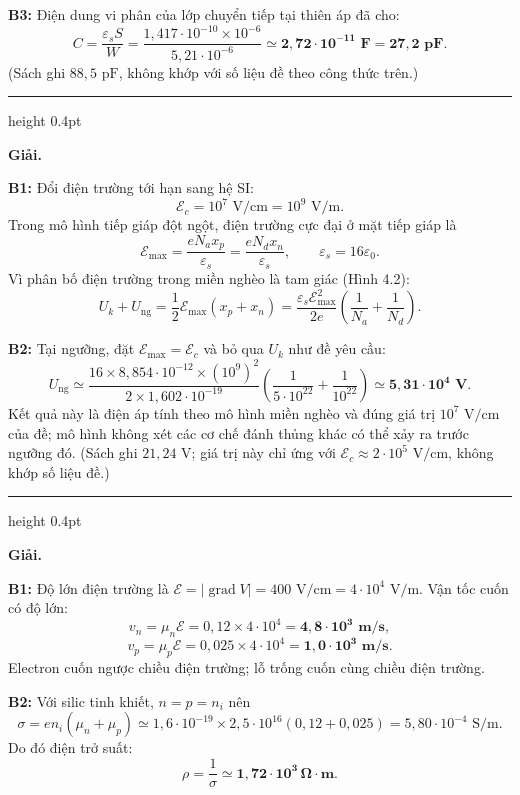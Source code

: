 \documentclass[11pt,a4paper]{article}
\renewcommand{\boldsymbol}[1]{\symbf{#1}}
\let\DeBaiOriginal\DeBai
\renewcommand{\DeBai}[1]{\par\Needspace{5\baselineskip}\DeBaiOriginal{#1}}
\newcommand{\PhanCachBai}{%
  \par\Needspace{7\baselineskip}%
  \addvspace{6pt}%
  {\color{black!40}\hrule height 0.4pt}%
  \nobreak\vspace{7pt}\nobreak
}
\begin{document}
\textbf{B3:} Điện dung vi phân của lớp chuyển tiếp tại thiên áp đã cho:
\[
C=\frac{\varepsilon_s S}{W}
=\frac{1{,}417\cdot10^{-10}\times10^{-6}}{5{,}21\cdot10^{-6}}
\simeq\boldsymbol{2{,}72\cdot10^{-11}\text{ F}=27{,}2\text{ pF}}.
\]
(Sách ghi $88{,}5\text{ pF}$, không khớp với số liệu đề theo công thức trên.)

\PhanCachBai


\textbf{Giải.}

\textbf{B1:} Đổi điện trường tới hạn sang hệ SI:
\[
\mathcal E_c=10^7\text{ V/cm}=10^9\text{ V/m}.
\]
Trong mô hình tiếp giáp đột ngột, điện trường cực đại ở mặt tiếp giáp là
\[
\mathcal E_{\max}=\frac{eN_a x_p}{\varepsilon_s}
=\frac{eN_d x_n}{\varepsilon_s},\qquad
\varepsilon_s=16\varepsilon_0.
\]
Vì phân bố điện trường trong miền nghèo là tam giác (Hình 4.2):
\[
U_k+U_{\mathrm{ng}}=\frac12\mathcal E_{\max}(x_p+x_n)
=\frac{\varepsilon_s\mathcal E_{\max}^2}{2e}
\left(\frac1{N_a}+\frac1{N_d}\right).
\]

\textbf{B2:} Tại ngưỡng, đặt $\mathcal E_{\max}=\mathcal E_c$ và bỏ qua $U_k$ như đề yêu cầu:
\[
U_{\mathrm{ng}}\simeq
\frac{16\times8{,}854\cdot10^{-12}\times(10^9)^2}{2\times1{,}602\cdot10^{-19}}
\left(\frac1{5\cdot10^{22}}+\frac1{10^{22}}\right)
\simeq\boldsymbol{5{,}31\cdot10^4\text{ V}}.
\]
Kết quả này là điện áp tính theo mô hình miền nghèo và đúng giá trị
$10^7\text{ V/cm}$ của đề; mô hình không xét các cơ chế đánh thủng khác có thể xảy ra trước ngưỡng đó.
(Sách ghi $21{,}24\text{ V}$; giá trị này chỉ ứng với $\mathcal E_c\approx2\cdot10^5\text{ V/cm}$, không khớp số liệu đề.)

\PhanCachBai


\textbf{Giải.}

\textbf{B1:} Độ lớn điện trường là
$\mathcal E=|\operatorname{grad}V|=400\text{ V/cm}=4\cdot10^4\text{ V/m}$.
Vận tốc cuốn có độ lớn:
\[
v_n=\mu_n\mathcal E=0{,}12\times4\cdot10^4
=\boldsymbol{4{,}8\cdot10^3\text{ m/s}},
\]
\[
v_p=\mu_p\mathcal E=0{,}025\times4\cdot10^4
=\boldsymbol{1{,}0\cdot10^3\text{ m/s}}.
\]
Electron cuốn ngược chiều điện trường; lỗ trống cuốn cùng chiều điện trường.

\textbf{B2:} Với silic tinh khiết, $n=p=n_i$ nên
\[
\sigma=e n_i(\mu_n+\mu_p)
\simeq1{,}6\cdot10^{-19}\times2{,}5\cdot10^{16}(0{,}12+0{,}025)
=5{,}80\cdot10^{-4}\text{ S/m}.
\]
Do đó điện trở suất:
\[
\rho=\frac1\sigma\simeq\boldsymbol{1{,}72\cdot10^3\,\Omega\cdot\text{m}}.
\]
\end{document}
